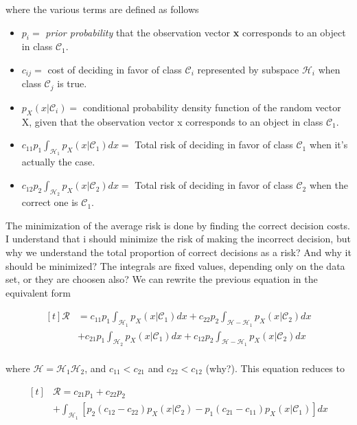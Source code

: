 \documentclass[twocolumn]{article}
\newcommand{\integral}{\displaystyle\int}
\begin{document}
		 \noindent where the various terms are defined as follows

		 \begin{itemize}
			 \item $ p_{i} =$ \textit{prior probability} that the observation vector \textbf{x} corresponds to an object in class $ \mathcal{C}_{1} $.
			 \item $ c_{ij} =$ cost of deciding in favor of class $ \mathcal{C}_{i} $ represented by subspace $ \mathcal{H}_{i} $ when class $ \mathcal{C}_{j} $ is true.
			 \item $ p_{X} (x | \mathcal{C}_{i}) =$ conditional probability density function of the random vector X, given that the observation vector x corresponds to an object in class $ \mathcal{C}_{1} $.
			 \item $ c_{11}p_{1}\integral_{ \mathcal{H}_{1}} p_{X} (x | \mathcal{C}_{1})dx =$ Total risk of deciding in favor of class $ \mathcal{C}_{1} $ when it's actually the case.
			 \item $ c_{12}p_{2}\integral_{ \mathcal{H}_{2}} p_{X} (x | \mathcal{C}_{2})dx =$ Total risk of deciding in favor of class $ \mathcal{C}_{2} $ when the correct one is $ \mathcal{C}_{1} $.
		 \end{itemize}

		 The minimization of the average risk is done by finding the correct decision costs. I understand that i should minimize the risk of making the incorrect decision, but why we understand the total proportion of correct decisions as a risk? And why it should be minimized? The integrals are fixed values, depending only on the data set, or they are choosen also?
		 We can rewrite the previous equation in the equivalent form

		 $$ \begin{aligned}[t]
				 \mathcal{R} & = c_{11}p_{1}\integral_{ \mathcal{H}_{1}}p_{X} (x | \mathcal{C}_{1})dx + c_{22}p_{2}\integral_{ \mathcal{H} - \mathcal{H}_{1}}p_{X} (x | \mathcal{C}_{2})dx  \\
				             & + c_{21}p_{1}\integral_{ \mathcal{H}_{2}}p_{X} (x | \mathcal{C}_{1})dx + c_{12}p_{2}\integral_{ \mathcal{H} - \mathcal{H}_{1}} p_{X} (x | \mathcal{C}_{2})dx \\
			 \end{aligned} $$

		 \noindent where $ \mathcal{H} = \mathcal{H}_{1} \mathcal{H}_{2} $, and $ c_{11} < c_{21} $ and $ c_{22} < c_{12} $ (why?). This equation reduces to

		 $$ \begin{aligned}[t]
				  & \mathcal{R} = c_{21}p_{1} + c_{22}p_{2}                                                                                                      \\
				  & + \integral_{ \mathcal{H}_{1} }[ p_{2} (c_{12} - c_{22})p_{X} (x | \mathcal{C}_{2}) - p_{1} (c_{21} - c_{11})p_{X} (x | \mathcal{C}_{1}) ]dx \\
			 \end{aligned}$$
\end{document}
